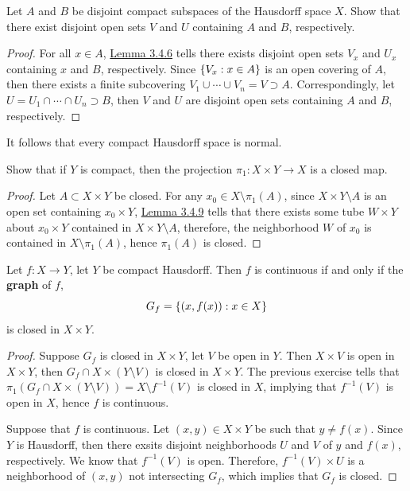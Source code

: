 \documentclass[12pt,a4paper]{article}
\begin{document}
    \begin{ex}\label{3.4.15}
        Let $A$ and $B$ be disjoint compact subspaces of the Hausdorff space $X$. Show that there exist disjoint open sets $V$ and $U$ containing $A$ and $B$, respectively. 
    \end{ex}
    \begin{proof}
        For all $x\in A$, \hyperref[3.4.6]{Lemma 3.4.6} tells there exists disjoint open sets $V_x$ and $U_x$ containing $x$ and $B$, respectively. Since $\left\{V_x:x\in A\right\}$ is an open covering of $A$, then there exists a finite subcovering $V_1\cup\cdots\cup V_n=V\supset A$. Correspondingly, let $U=U_1\cap\cdots\cap U_n\supset B$, then $V$ and $U$ are disjoint open sets containing $A$ and $B$, respectively.
    \end{proof}
    \begin{remark}
        It follows that every compact Hausdorff space is normal.
    \end{remark}
    \hfill

    \begin{ex}
        Show that if $Y$ is compact, then the projection $\pi_1:X\times Y\to X$ is a closed map.
    \end{ex}
    \begin{proof}
        Let $A\subset X\times Y$ be closed. For any $x_0\in X\setminus\pi_1(A)$, since $X\times Y\setminus A$ is an open set containing $x_0\times Y$, \hyperref[3.4.9]{Lemma 3.4.9} tells that there exists some tube $W\times Y$ about $x_0\times Y$ contained in $X\times Y\setminus A$, therefore, the neighborhood $W$ of $x_0$ is contained in $X\setminus\pi_1(A)$, hence $\pi_1(A)$ is closed.  
    \end{proof}
    \hfill

    \begin{ex}
        Let $f:X\to Y$, let $Y$ be compact Hausdorff. Then $f$ is continuous if and only if the \textbf{graph} of $f$,
        $$
        G_f=\left\{(x,f(x)):x\in X\right\}
        $$
        is closed in $X\times Y$.
    \end{ex}
    \begin{proof}
        Suppose $G_f$ is closed in $X\times Y$, let $V$ be open in $Y$. Then $X\times V$ is open in $X\times Y$, then $G_f\cap X\times (Y\setminus V)$ is closed in $X\times Y$. The previous exercise tells that $\pi_1(G_f\cap X\times (Y\setminus V))=X\setminus f^{-1}(V)$ is closed in $X$, implying that $f^{-1}(V)$ is open in $X$, hence $f$ is continuous.

        Suppose that $f$ is continuous. Let $(x,y)\in X\times Y$ be such that $y\neq f(x)$. Since $Y$ is Hausdorff, then there exsits disjoint neighborhoods $U$ and $V$ of $y$ and $f(x)$, respectively. We know that $f^{-1}(V)$ is open. Therefore, $f^{-1}(V)\times U$ is a neighborhood of $(x,y)$ not intersecting $G_f$, which implies that $G_f$ is closed.
    \end{proof}
    \hfill
\end{document}

